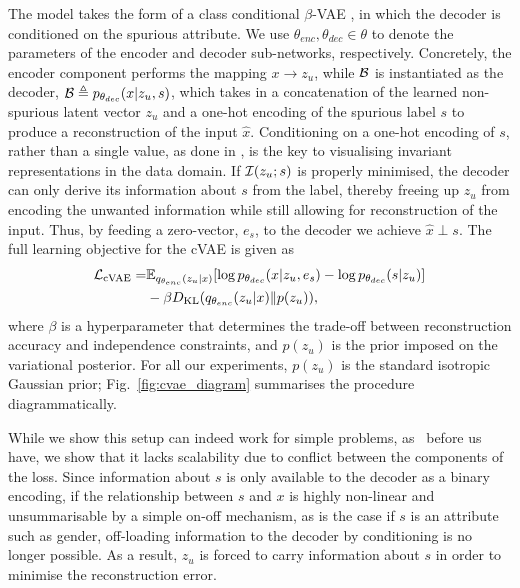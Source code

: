 The model takes the form of a class conditional $\beta$-\acs{VAE} \citep{higgins2017beta}, in which the
decoder is conditioned on the spurious attribute. 
%
We use $\theta_{enc}, \theta_{dec} \in \theta$ to denote the parameters of the encoder and decoder
sub-networks, respectively. 
%
Concretely, the encoder component performs the mapping $x \to{z_u}$, while ${\mathcal{B}}$ is instantiated as
the decoder, ${\mathcal{B}} \triangleq p_{\theta_{dec}}(x|z_u, s)$, which takes in a concatenation of the
learned non-spurious latent vector $z_u$ and a one-hot encoding of the spurious label $s$ to
produce a reconstruction of the input $\hat{x}$. 
%
Conditioning on a one-hot encoding of $s$, rather than a single value, as done in
\citet{madras2018learning}, is the key to visualising invariant representations in the data domain.
%
If ${\mathcal{I}}(z_u; s)$ is properly minimised, the decoder can only derive its information about $s$ from
the label, thereby freeing up $z_u$ from encoding the unwanted information while still allowing for
reconstruction of the input.
%
Thus, by feeding a zero-vector, \(e_s\), to the decoder we achieve $\hat{x} \perp s$. 
%
The full learning objective for the \ac{cVAE} is given as
%
\begin{align}
%
\begin{split}
    \gL_{\mathrm{cVAE}} =& 
    \E_{q_{\theta_{enc}}(z_u|x)}[
    \log
    p_{\theta_{dec}}(x|z_u, e_s) - \log p_{\theta_{dec}}(s|z_u)
    ] \\ &- \beta \KL(q_{\theta_{enc}}(z_u |x) \| p(z_u)),
\end{split}
%
\label{eq:cvae-obj}
\end{align}
%
where $\beta$ is a hyperparameter that determines the trade-off between reconstruction accuracy and
independence constraints, and $p(z_u)$ is the prior imposed on the variational posterior. 
%
For all our experiments, $p(z_u)$ is the standard isotropic Gaussian prior;
Fig.~\ref{fig:cvae_diagram} summarises the procedure diagrammatically.
%

While we show this setup can indeed work for simple problems, as~\citet{madras2018learning} before
us have, we show that it lacks scalability due to conflict between the components of the loss.
%
Since information about $s$ is only available to the decoder as a binary encoding, if the
relationship between $s$ and $x$ is highly non-linear and unsummarisable by a simple on-off
mechanism, as is the case if $s$ is an attribute such as gender, off-loading information to the
decoder by conditioning is no longer possible. 
%
As a result, $z_u$ is forced to carry information about $s$ in order to minimise the
reconstruction error. 

